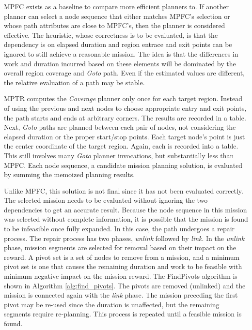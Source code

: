 \documentclass{tamuccthesis}
\begin{document}
MPFC exists as a baseline to compare more efficient planners to. If another planner can select a node sequence that either matches MPFC's selection or whose path attributes are close to MPFC's, then the planner is considered effective. The heuristic, whose correctness is to be evaluated, is that the dependency is on elapsed duration and region entrace and exit points can be ignored to still achieve a reasonable mission. The idea is that the differences in work and duration incurred based on these elements will be dominated by the overall region coverage and \textit{Goto} path. Even if the estimated values are different, the relative evaluation of a path may be stable. 

MPTR computes the \textit{Coverage} planner only once for each target region. Instead of using the previous and next nodes to choose appropriate entry and exit points, the path starts and ends at arbitrary corners. The results are recorded in a table. Next, \textit{Goto} paths are planned between each pair of nodes, not considering the elapsed duration or the proper start/stop points. Each target node's point is just the center coordinate of the target region. Again, each is recorded into a table. This still involves many \textit{Goto} planner invocations, but substantially less than MPFC. Each node sequence, a candidate mission planning solution, is evaluated by summing the memoized planning results. 

Unlike MPFC, this solution is not final since it has not been evaluated correctly. The selected mission needs to be evaluated without ignoring the two dependencies to get an accurate result. Because the node sequence in this mission was selected without complete information, it is possible that the mission is found to be infeasible once fully expanded. In this case, the path undergoes a repair process. The repair process has two phases, \textit{unlink} followed by \textit{link}. In the \textit{unlink} phase, mission segments are selected for removal based on their impact on the reward. A pivot set is a set of nodes to remove from a mission, and a minimum pivot set is one that causes the remaining duration and work to be feasible with minimum negative impact on the mission reward. The FindPivots algorithm is shown in Algorithm \ref{alg:find_pivots}. The pivots are removed (unlinked) and the mission is connected again with the \textit{link} phase. The mission preceding the first pivot may be re-used since the duration is unaffected, but the remaining segments require re-planning. This process is repeated until a feasible mission is found. 
\end{document}
